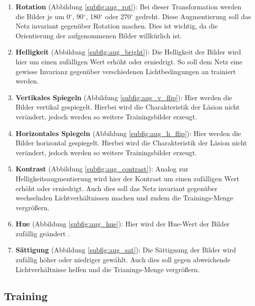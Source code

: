 \begin{enumerate}
    \item \textbf{Rotation} (Abbildung \ref{subfig:aug_rot}): Bei dieser Transformation werden die Bilder je um 0$^{\circ}$, 90$^{\circ}$, 180$^{\circ}$ oder 270$^{\circ}$ gedreht. Diese Augmentierung soll das Netz invariant gegenüber Rotation machen. Dies ist wichtig, da die Orientierung der aufgenommenen Bilder willkürlich ist.
    
    \item \textbf{Helligkeit} (Abbildung \ref{subfig:aug_bright}):  Die Helligkeit der Bilder wird hier um einen zufälligen Wert erhöht oder erniedrigt. So soll dem Netz eine gewisse Invarianz gegenüber verschiedenen Lichtbedingungen an trainiert werden.
    
    \item \textbf{Vertikales Spiegeln} (Abbildung \ref{subfig:aug_v_flip}): Hier werden die Bilder vertikal gespiegelt. Hierbei wird die Charakteristik der Läsion nicht verändert, jedoch werden so weitere Trainingsbilder erzeugt. 
    
    \item \textbf{Horizontales Spiegeln} (Abbildung \ref{subfig:aug_h_flip}):  Hier werden die Bilder horizontal gespiegelt. Hierbei wird die Charakteristik der Läsion nicht verändert, jedoch werden so weitere Trainingsbilder erzeugt.
    
    \item \textbf{Kontrast} (Abbildung \ref{subfig:aug_contrast}):  Analog zur Helligkeitsaugmentierung wird hier der Kontrast um einen zufälligen Wert erhöht oder erniedrigt. Auch dies soll das Netz invariant gegenüber wechselnden Lichtverhältnissen machen und zudem die Trainings-Menge vergrößern.
    
    \item \textbf{Hue} (Abbildung \ref{subfig:aug_hue}):  Hier wird der Hue-Wert der Bilder zufällig geändert . 
    
    \item \textbf{Sättigung} (Abbildung \ref{subfig:aug_sat}):  Die Sättignung der Bilder wird zufällig höher oder niedriger gewählt. Auch dies soll gegen abweichende Lichtverhältnisse helfen und die Trianings-Menge vergrößern.
\end{enumerate}

\subsection{Training}

